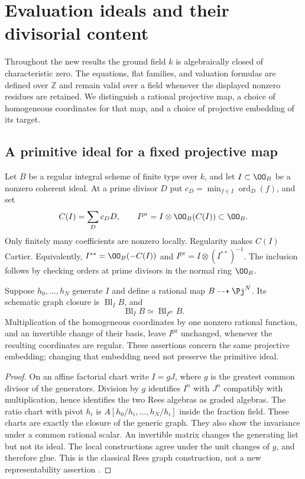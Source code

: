 \section{Evaluation ideals and their divisorial content}
\label{sec:content-v169}
Throughout the new results the ground field $k$ is algebraically closed
of characteristic zero. The equations, flat families, and valuation
formulas are defined over $\mathbb Z$ and remain valid over a field
whenever the displayed nonzero residues are retained. We distinguish a
rational projective map, a choice of homogeneous coordinates for that
map, and a choice of projective embedding of its target.

\subsection{A primitive ideal for a fixed projective map}
Let $B$ be a regular integral scheme of finite type over $k$, and let
$I\subset\OO_B$ be a nonzero coherent ideal. At a prime divisor $D$ put
$c_D=\min_{f\in I}\operatorname{ord}_D(f)$, and set
\[
 C(I)=\sum_D c_DD,\qquad
 I^{\mathrm{pr}}=I\otimes\OO_B(C(I))\subset\OO_B.
\]
Only finitely many coefficients are nonzero locally. Regularity makes
$C(I)$ Cartier. Equivalently, $I^{**}=\OO_B(-C(I))$ and
$I^{\mathrm{pr}}=I\otimes(I^{**})^{-1}$. The inclusion follows by checking
orders at prime divisors in the normal ring $\OO_B$.

\begin{proposition}\label{prop:content-v169}
Suppose $h_0,\ldots,h_N$ generate $I$ and define a rational map
$B\dashrightarrow\Pj^N$. Its schematic graph closure is
$\operatorname{Bl}_I B$, and
\[
 \operatorname{Bl}_I B\simeq\operatorname{Bl}_{I^{\mathrm{pr}}}B.
\]
Multiplication of the homogeneous coordinates by one nonzero rational
function, and an invertible change of their basis, leave
$I^{\mathrm{pr}}$ unchanged, whenever the resulting coordinates are
regular. These assertions concern the same projective embedding;
changing that embedding need not preserve the primitive ideal.
\end{proposition}
\begin{proof}
On an affine factorial chart write $I=gJ$, where $g$ is the greatest
common divisor of the generators. Division by $g$ identifies
$I^n$ with $J^n$ compatibly with multiplication, hence identifies the
two Rees algebras as graded algebras. The ratio chart with pivot $h_i$
is $A[h_0/h_i,\ldots,h_N/h_i]$ inside the fraction field. These charts
are exactly the closure of the generic graph. They also show the
invariance under a common rational scalar. An invertible matrix changes
the generating list but not its ideal. The local constructions agree
under the unit changes of $g$, and therefore glue. This is the classical
Rees graph construction, not a new representability assertion
\cite{Stacks169}.
\end{proof}

